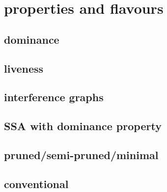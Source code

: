 \chapter{properties and flavours}


\section{dominance}
\section{liveness}
\section{interference graphs}
\section{SSA with dominance property}
\section{pruned/semi-pruned/minimal}
\section{conventional}

